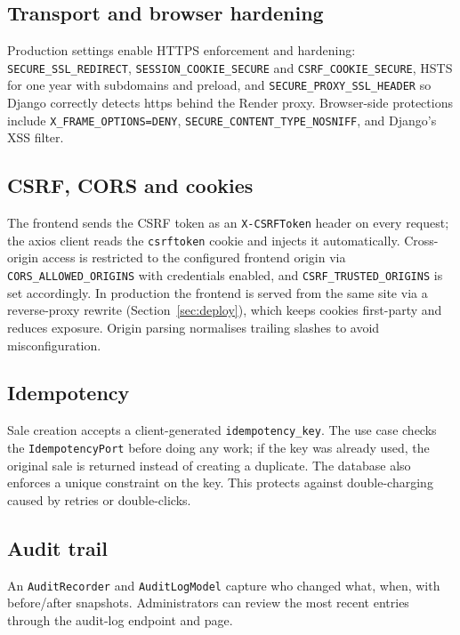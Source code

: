 \documentclass[11pt,a4paper]{article}
\begin{document}
\subsection{Transport and browser hardening}

Production settings enable HTTPS enforcement and hardening: \texttt{SECURE\_SSL\_REDIRECT},
\texttt{SESSION\_COOKIE\_SECURE} and \texttt{CSRF\_COOKIE\_SECURE}, HSTS for one year with subdomains
and preload, and \texttt{SECURE\_PROXY\_SSL\_HEADER} so Django correctly detects https behind the
Render proxy. Browser-side protections include \texttt{X\_FRAME\_OPTIONS=DENY},
\texttt{SECURE\_CONTENT\_TYPE\_NOSNIFF}, and Django's XSS filter.

\subsection{CSRF, CORS and cookies}

The frontend sends the CSRF token as an \texttt{X-CSRFToken} header on every request; the axios client
reads the \texttt{csrftoken} cookie and injects it automatically. Cross-origin access is restricted to
the configured frontend origin via \texttt{CORS\_ALLOWED\_ORIGINS} with credentials enabled, and
\texttt{CSRF\_TRUSTED\_ORIGINS} is set accordingly. In production the frontend is served from the same
site via a reverse-proxy rewrite (Section~\ref{sec:deploy}), which keeps cookies first-party and
reduces exposure. Origin parsing normalises trailing slashes to avoid misconfiguration.

\subsection{Idempotency}

Sale creation accepts a client-generated \texttt{idempotency\_key}. The use case checks the
\texttt{IdempotencyPort} before doing any work; if the key was already used, the original sale is
returned instead of creating a duplicate. The database also enforces a unique constraint on the key.
This protects against double-charging caused by retries or double-clicks.

\subsection{Audit trail}

An \texttt{AuditRecorder} and \texttt{AuditLogModel} capture who changed what, when, with
before/after snapshots. Administrators can review the most recent entries through the audit-log
endpoint and page.
\end{document}
